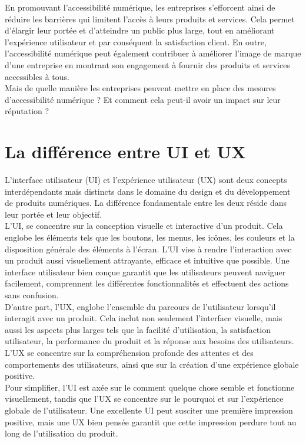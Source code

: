\documentclass[12pt, a4paper]{report}
\begin{document}
En promouvant l'accessibilité numérique, les entreprises s'efforcent ainsi de réduire les barrières qui limitent l'accès à leurs produits et services. Cela permet d'élargir leur portée et d'atteindre un public plus large, tout en améliorant l'expérience utilisateur et par conséquent la satisfaction client. En outre, l'accessibilité numérique peut également contribuer à améliorer l'image de marque d'une entreprise en montrant son engagement à fournir des produits et services accessibles à tous.\\

Mais de quelle manière les entreprises peuvent mettre en place des mesures d'accessibilité numérique ? Et comment cela peut-il avoir un impact sur leur réputation ?

\section{La différence entre UI et UX}

L'interface utilisateur (UI) et l'expérience utilisateur (UX) sont deux concepts interdépendants mais distincts dans le domaine du design et du développement de produits numériques. La différence fondamentale entre les deux réside dans leur portée et leur objectif.\\

L'UI, se concentre sur la conception visuelle et interactive d'un produit. Cela englobe les éléments tels que les boutons, les menus, les icônes, les couleurs et la disposition générale des éléments à l'écran. L'UI vise à rendre l'interaction avec un produit aussi visuellement attrayante, efficace et intuitive que possible. Une interface utilisateur bien conçue garantit que les utilisateurs peuvent naviguer facilement, comprennent les différentes fonctionnalités et effectuent des actions sans confusion.\\

D'autre part, l'UX, englobe l'ensemble du parcours de l'utilisateur lorsqu'il interagit avec un produit. Cela inclut non seulement l'interface visuelle, mais aussi les aspects plus larges tels que la facilité d'utilisation, la satisfaction utilisateur, la performance du produit et la réponse aux besoins des utilisateurs. L'UX se concentre sur la compréhension profonde des attentes et des comportements des utilisateurs, ainsi que sur la création d'une expérience globale positive.\\

Pour simplifier, l'UI est axée sur le comment quelque chose semble et fonctionne visuellement, tandis que l'UX se concentre sur le pourquoi et sur l'expérience globale de l'utilisateur. Une excellente UI peut susciter une première impression positive, mais une UX bien pensée garantit que cette impression perdure tout au long de l'utilisation du produit.\\
\end{document}
